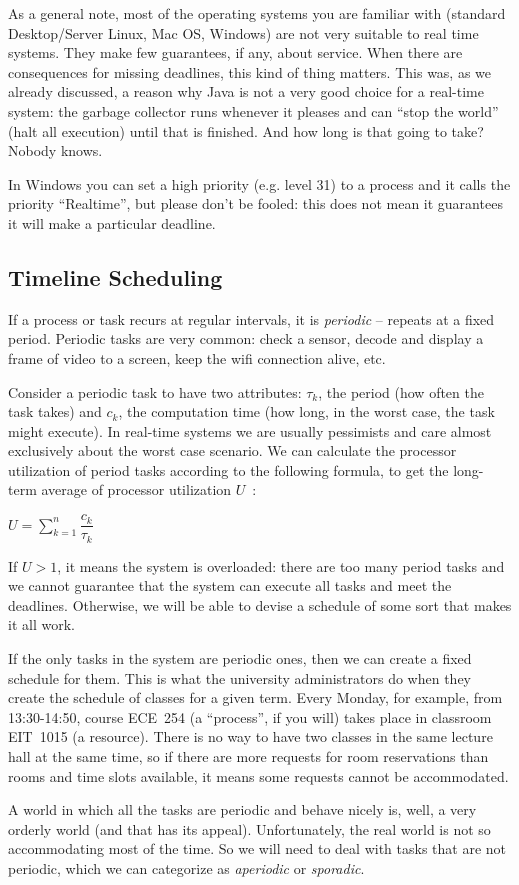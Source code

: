 As a general note, most of the operating systems you are familiar with (standard Desktop/Server Linux, Mac OS, Windows) are not very suitable to real time systems. They make few guarantees, if any, about service. When there are consequences for missing deadlines, this kind of thing matters. This was, as we already discussed, a reason why Java is not a very good choice for a real-time system: the garbage collector runs whenever it pleases and can ``stop the world'' (halt all execution) until that is finished. And how long is that going to take? Nobody knows.

In Windows you can set a high priority (e.g. level 31) to a process and it calls the priority ``Realtime'', but please don't be fooled: this does not mean it guarantees it will make a particular deadline.

\subsection*{Timeline Scheduling}
If a process or task recurs at regular intervals, it is \textit{periodic} -- repeats at a fixed period. Periodic tasks are very common: check a sensor, decode and display a frame of video to a screen, keep the wifi connection alive, etc.

Consider a periodic task to have two attributes: $\tau_{k}$, the period (how often the task takes) and $c_{k}$, the computation time (how long, in the worst case, the task might execute). In real-time systems we are usually pessimists and care almost exclusively about the worst case scenario. We can calculate the processor utilization of period tasks according to the following formula, to get the long-term average of processor utilization $U$~\cite{mte241}:

\begin{center}
$U = \sum\limits_{k=1}^n\dfrac{c_{k}}{\tau_{k}}$
\end{center}

If $U > 1$, it means the system is overloaded: there are too many period tasks and we cannot guarantee that the system can execute all tasks and meet the deadlines. Otherwise, we will be able to devise a schedule of some sort that makes it all work.

If the only tasks in the system are periodic ones, then we can create a fixed schedule for them. This is what the university administrators do when they create the schedule of classes for a given term. Every Monday, for example, from 13:30-14:50, course ECE~254 (a ``process'', if you will) takes place in classroom EIT~1015 (a resource). There is no way to have two classes in the same lecture hall at the same time, so if there are more requests for room reservations than rooms and time slots available, it means some requests cannot be accommodated.

A world in which all the tasks are periodic and behave nicely is, well, a very orderly world (and that has its appeal). Unfortunately, the real world is not so accommodating most of the time. So we will need to deal with tasks that are not periodic, which we can categorize as \textit{aperiodic} or \textit{sporadic}.




